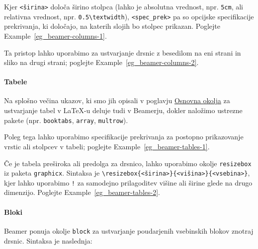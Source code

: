 Kjer \texttt{\textless širina\textgreater } določa širino stolpca (lahko je absolutna vrednost, npr. \texttt{5cm}, ali relativna vrednost, npr. \texttt{0.5{\textbackslash}textwidth}), \texttt{\textless spec\_prek\textgreater } pa so opcijske specifikacije prekrivanja, ki določajo, na katerih slojih bo stolpec prikazan.
Poglejte Example~\ref{eg_beamer-columns-1}.

\begin{example}\label{eg_beamer-columns-1}\end{example}Ta pristop lahko uporabimo za ustvarjanje drsnic z besedilom na eni strani in sliko na drugi strani; poglejte Example~\ref{eg_beamer-columns-2}.

\begin{example}\label{eg_beamer-columns-2}\end{example}\paragraph{Tabele}

Na splošno večina ukazov, ki smo jih opisali
v poglavju \href{/latexosnovnaokolja}{Osnovna okolja} za ustvarjanje tabel v LaTeX-u deluje tudi v Beamerju, dokler naložimo ustrezne pakete (npr. \texttt{booktabs}, \texttt{array}, \texttt{multrow}).

Poleg tega lahko uporabimo specifikacije prekrivanja za postopno prikazovanje vrstic ali stolpcev v tabeli; poglejte Example~\ref{eg_beamer-tables-1}.

\begin{example}\label{eg_beamer-tables-1}\end{example}Če je tabela preširoka ali predolga za drsnico, lahko uporabimo okolje \texttt{resizebox} iz paketa \texttt{graphicx}. Sintaksa je \texttt{{\textbackslash}resizebox\{\textless širina\textgreater \}\{\textless višina\textgreater \}\{\textless vsebina\textgreater \}}, kjer lahko uporabimo \texttt{!} za samodejno prilagoditev višine ali širine glede na drugo dimenzijo.
Poglejte Example~\ref{eg_beamer-tables-2}.

\begin{example}\label{eg_beamer-tables-2}\end{example}\paragraph{Bloki}

Beamer ponuja okolje \texttt{block} za ustvarjanje poudarjenih vsebinskih blokov znotraj drsnic. Sintaksa je naslednja:

